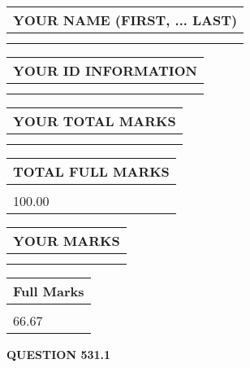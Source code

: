 \documentclass{ctexart}
\begin{document}
   
   
   
\newpage 
\setcounter{page}{ 
   531001 } 
   
   
   
   
\noindent\begin{tabular}{|l|}
\hline
YOUR NAME (FIRST, ... LAST)  \\
\hline
 \\ 
 \\ 
\hline
\end{tabular}
\hspace{0.05in} \begin{tabular}{|l|}
\hline
 YOUR   ID   INFORMATION  \\
\hline
 \\ 
 \\ 
\hline
\end{tabular}
   
   
\vspace{0.2in}\noindent\begin{tabular}{|l|}
\hline
YOUR TOTAL MARKS  \\
\hline
 \\ 
 \\ 
\hline
\end{tabular}
\hspace{0.05in} \begin{tabular}{|l|}
\hline
TOTAL FULL MARKS  \\
\hline
 \\ 
100.00 \\
\hline
\end{tabular}
   
   
 \vspace{0.2in}
 
 
 
 
   
   
  
\vspace{0.2in}
  
\noindent\begin{tabular}{|l|}
\hline
 YOUR MARKS  \\
\hline
 \\ 
 \\ 
\hline
\end{tabular}
\hspace{0.05in} \begin{tabular}{|l|}
\hline
 Full Marks  \\
\hline
 \\ 
66.67 \\
\hline
\end{tabular}
{\textbf{\Large{QUESTION
531.1 
}}}
  
\end{document}
